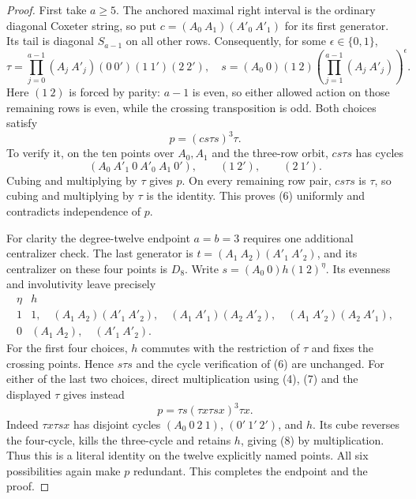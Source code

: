 \documentclass[11pt,a4paper]{article}
\begin{document}
\begin{proof}
First take $a\geq5$. The anchored maximal right interval is
the ordinary diagonal Coxeter string, so put
$c=(A_0\ A_1)(A'_0\ A'_1)$ for its first generator.
Its tail is diagonal $S_{a-1}$ on all other rows.
Consequently, for some $\epsilon\in\{0,1\}$,
\[
 \tau=\prod_{j=0}^{a-1}(A_j\ A'_j)(0\ 0')(1\ 1')(2\ 2'),
 \quad
 s=(A_0\ 0)(1\ 2)
       \left(\prod_{j=1}^{a-1}(A_j\ A'_j)\right)^\epsilon. \tag{5}
\]
Here $(1\ 2)$ is forced by parity: $a-1$ is even, so either
allowed action on those remaining rows is even, while the
crossing transposition is odd. Both choices satisfy
\[
                         p=(c s\tau s)^3\tau.             \tag{6}
\]
To verify it, on the ten points over $A_0,A_1$ and the
three-row orbit, $c s\tau s$ has cycles
\[
 (A_0\ A'_1\ 0\ A'_0\ A_1\ 0'),\qquad
 (1\ 2'),\qquad(2\ 1').
\]
Cubing and multiplying by $\tau$ gives $p$. On every
remaining row pair, $c s\tau s$ is $\tau$, so cubing and
multiplying by $\tau$ is the identity. This proves (6)
uniformly and contradicts independence of $p$.

For clarity the degree-twelve endpoint $a=b=3$ requires
one additional centralizer check. The last generator is
$t=(A_1\ A_2)(A'_1\ A'_2)$, and its centralizer on these
four points is $D_8$. Write $s=(A_0\ 0)h(1\ 2)^\eta$.
Its evenness and involutivity leave precisely
\[
\begin{array}{c|l}
\eta&h\\\hline
1&1,\quad (A_1\ A_2)(A'_1\ A'_2),\quad
 (A_1\ A'_1)(A_2\ A'_2),\quad
 (A_1\ A'_2)(A_2\ A'_1),\\
0&(A_1\ A_2),\quad (A'_1\ A'_2).
\end{array}                                               \tag{7}
\]
For the first four choices, $h$ commutes with the restriction
of $\tau$ and fixes the crossing points. Hence $s\tau s$
and the cycle verification of (6) are unchanged.
For either of the last two choices, direct multiplication
using (4), (7) and the displayed $\tau$ gives instead
\[
                p=\tau s(\tau x\tau s x)^3\tau x.          \tag{8}
\]
Indeed $\tau x\tau s x$ has disjoint cycles
$(A_0\ 0\ 2\ 1)$, $(0'\ 1'\ 2')$, and $h$.
Its cube reverses the four-cycle, kills the three-cycle and
retains $h$, giving (8) by multiplication. Thus this is a
literal identity on the twelve explicitly named points.
All six possibilities again make $p$ redundant.
This completes the endpoint and the proof.
\end{proof}
\end{document}
